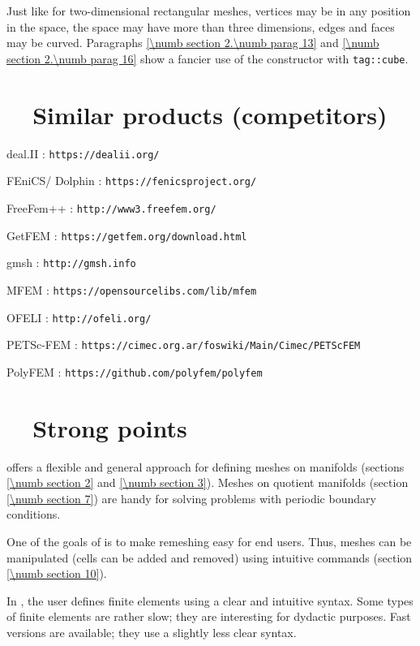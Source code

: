 Just like for two-dimensional rectangular meshes, vertices may be in any position in the space,
the space may have more than three dimensions, edges and faces may be curved.
Paragraphs \ref{\numb section 2.\numb parag 13} and \ref{\numb section 2.\numb parag 16} show a
fancier use of the {\small\tt{}} constructor with {\small\tt\textcolor{tag}{tag}::cube}.





\section{~~Similar products (competitors)}\label{\numb section 1.\numb parag 8}

deal.II : {\small\tt https://dealii.org/}

FEniCS/ Dolphin : {\small\tt https://fenicsproject.org/}

FreeFem++ : {\small\tt http://www3.freefem.org/}

GetFEM : {\small\tt https://getfem.org/download.html}

gmsh : {\small\tt http://gmsh.info}

MFEM : {\small\tt https://opensourcelibs.com/lib/mfem}

OFELI : {\small\tt http://ofeli.org/}

PETSc-FEM : {\small\tt https://cimec.org.ar/foswiki/Main/Cimec/PETScFEM}

PolyFEM : {\small\tt https://github.com/polyfem/polyfem}


\section{~~Strong points}\label{\numb section 1.\numb parag 9}

{\ManiFEM} offers a flexible and general approach for defining meshes on manifolds
(sections \ref{\numb section 2} and \ref{\numb section 3}).
Meshes on quotient manifolds (section \ref{\numb section 7}) are handy for solving
problems with periodic boundary conditions.

One of the goals of {\maniFEM} is to make remeshing easy for end users.
Thus, meshes can be manipulated (cells can be added and removed) using intuitive commands
(section \ref{\numb section 10}).

In {\maniFEM}, the user defines finite elements using a clear and intuitive syntax.
Some types of finite elements are rather slow; they are interesting for dydactic purposes.
Fast versions are available; they use a slightly less clear syntax.


